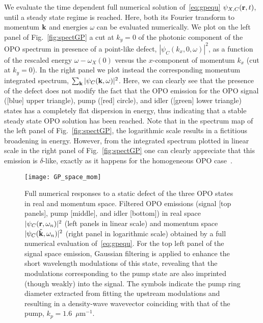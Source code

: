 We evaluate the time dependent full numerical solution
of~\eqref{eq:gpequ} $\psi_{X,C} (\mathbf{r},t)$, until a steady state
regime is reached. Here, both its Fourier transform to momentum
$\mathbf{k}$ and energies $\omega$ can be evaluated numerically.
%
We plot on the left panel of Fig.~\ref{fig:spectGP} a cut at $k_y=0$
of the photonic component of the OPO spectrum in presence of a
point-like defect, $|\psi_C(k_x,0,\omega)|^2$, as a function of the
rescaled energy $\omega - \omega_X(0)$ versus the $x$-component of
momentum $k_x$ (cut at $k_y=0$). In the right panel we plot instead
the corresponding momentum integrated spectrum, $\sum_{\mathbf{k}}
|\psi_C(\mathbf{k},\omega)|^2$.
%
Here, we can clearly see that the presence of the defect does not
modify the fact that the OPO emission for the OPO signal ([blue] upper
triangle), pump ([red] circle), and idler ([green] lower triangle)
states has a completely flat dispersion in energy, thus indicating
that a stable steady state OPO solution has been reached. Note that in
the spectrum map of the left panel of Fig.~\ref{fig:spectGP}, the
logarithmic scale results in a fictitious broadening in
energy. However, from the integrated spectrum plotted in linear scale
in the right panel of Fig.~\ref{fig:spectGP} one can clearly appreciate
that this emission is $\delta$-like, exactly as it happens for the
homogeneous OPO case~\cite{9783642241857}.
%
\begin{figure}[tb]
\centering
\texttt{[image: GP\_space\_mom]}
\caption{Full numerical responses to a static defect of
  the three OPO states in real and momentum space. Filtered OPO
  emissions (signal [top panels], pump [middle], and idler [bottom])
  in real space $|\psi_C (\mathbf{r},\omega_n)|^2$ (left panels in
  linear scale) and momentum space $|\psi_C
  (\tilde{\mathbf{k}},\omega_n)|^2$ (right panel in logarithmic scale)
  obtained by a full numerical evaluation of~\eqref{eq:gpequ}. For the
  top left panel of the signal space emission, Gaussian filtering is
  applied to enhance the short wavelength modulations of this state,
  revealing that the modulations corresponding to the pump state are
  also imprinted (though weakly) into the signal. The symbols indicate
  the pump ring diameter extracted from fitting the upstream
  modulations and resulting in a density-wave wavevector coinciding
  with that of the pump, $k_p=1.6$~$\mu$m$^{-1}$.}
\label{fig:numer}
\end{figure}
%
